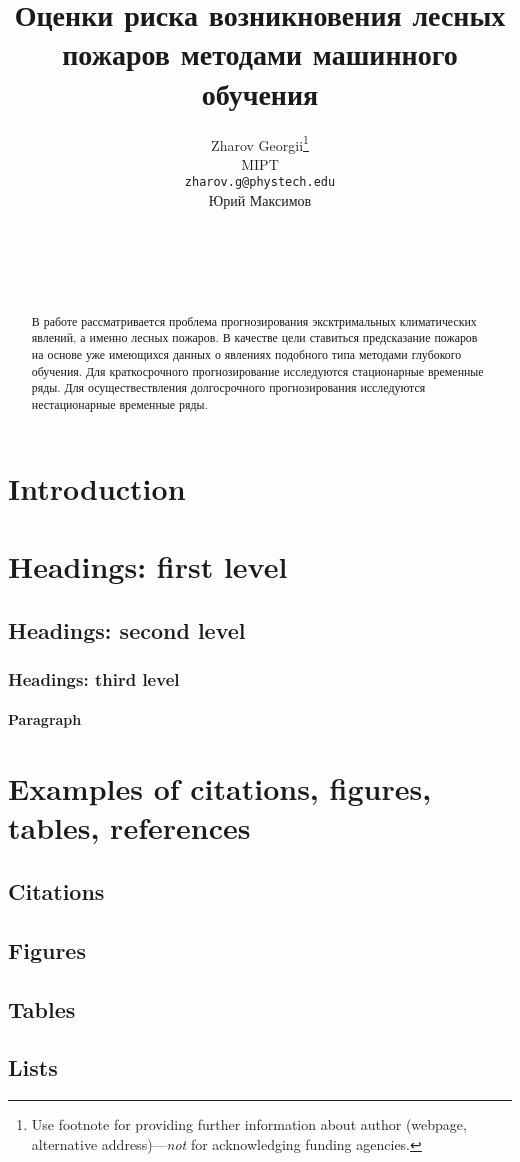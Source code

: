 \documentclass{article}
\title{Оценки риска возникновения лесных пожаров методами машинного обучения}
\author{ Zharov Georgii\thanks{Use footnote for providing further
		information about author (webpage, alternative
		address)---\emph{not} for acknowledging funding agencies.} \\
MIPT\\
	\texttt{zharov.g@phystech.edu} \\
	\And
Юрий Максимов \\
\\
\\
\\
\\
}
\date{}
\begin{document}
\maketitle

\begin{abstract}
В работе рассматривается проблема прогнозирования эксктримальных климатических явлений, а именно лесных пожаров. В качестве цели ставиться предсказание пожаров на основе уже имеющихся данных о явлениях подобного типа методами глубокого обучения. Для краткосрочного прогнозирование исследуются стационарные временные ряды. Для осуществествления долгосрочного прогнозирования исследуются нестационарные временные ряды.
\end{abstract}



\section{Introduction}

\section{Headings: first level}
\label{sec:headings}


\subsection{Headings: second level}


\subsubsection{Headings: third level}


\paragraph{Paragraph}




\section{Examples of citations, figures, tables, references}
\label{sec:others}

\subsection{Citations}


\subsection{Figures}



\subsection{Tables}


\subsection{Lists}




\end{document}
